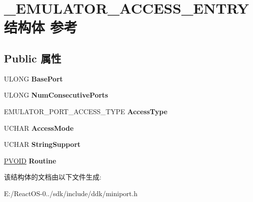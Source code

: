 \hypertarget{struct___e_m_u_l_a_t_o_r___a_c_c_e_s_s___e_n_t_r_y}{}\section{\+\_\+\+E\+M\+U\+L\+A\+T\+O\+R\+\_\+\+A\+C\+C\+E\+S\+S\+\_\+\+E\+N\+T\+R\+Y结构体 参考}
\label{struct___e_m_u_l_a_t_o_r___a_c_c_e_s_s___e_n_t_r_y}
\subsection*{Public 属性}
\begin{DoxyCompactItemize}
\item 
\mbox{\label{struct___e_m_u_l_a_t_o_r___a_c_c_e_s_s___e_n_t_r_y_a71e55a3c9db30e61ac6775556cbf74d0}} 
U\+L\+O\+NG {\bfseries Base\+Port}
\item 
\mbox{\label{struct___e_m_u_l_a_t_o_r___a_c_c_e_s_s___e_n_t_r_y_a7bf628a5414bb524d1418713d0196882}} 
U\+L\+O\+NG {\bfseries Num\+Consecutive\+Ports}
\item 
\mbox{\label{struct___e_m_u_l_a_t_o_r___a_c_c_e_s_s___e_n_t_r_y_ab2723cad08abaf459a0575e497c84c03}} 
E\+M\+U\+L\+A\+T\+O\+R\+\_\+\+P\+O\+R\+T\+\_\+\+A\+C\+C\+E\+S\+S\+\_\+\+T\+Y\+PE {\bfseries Access\+Type}
\item 
\mbox{\label{struct___e_m_u_l_a_t_o_r___a_c_c_e_s_s___e_n_t_r_y_a7f8d6b69de36df36c0906bfd683ac425}} 
U\+C\+H\+AR {\bfseries Access\+Mode}
\item 
\mbox{\label{struct___e_m_u_l_a_t_o_r___a_c_c_e_s_s___e_n_t_r_y_afc55a4c616ebe199e847d314465ab513}} 
U\+C\+H\+AR {\bfseries String\+Support}
\item 
\mbox{\label{struct___e_m_u_l_a_t_o_r___a_c_c_e_s_s___e_n_t_r_y_a1c8c7e953dc490d47d05e9cc29af5b91}} 
\hyperlink{interfacevoid}{P\+V\+O\+ID} {\bfseries Routine}
\end{DoxyCompactItemize}


该结构体的文档由以下文件生成\+:\begin{DoxyCompactItemize}
\item 
E\+:/\+React\+O\+S-\/0../sdk/include/ddk/miniport.\+h\end{DoxyCompactItemize}
